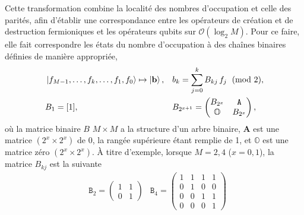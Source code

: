 \documentclass[12pt,a4paper,svgnames,x11names,rgb,table]{article} %
\numberwithin{equation}{section} %
\numberwithin{figure}{section} %
\numberwithin{table}{section} %
\begin{document}
Cette transformation combine la localité des nombres d'occupation et celle des parités, afin d'établir une correspondance entre les opérateurs de création et de destruction fermioniques et les opérateurs qubits sur $\mathcal{O}(\log_2M)$. Pour ce faire, elle fait correspondre les états du nombre d'occupation à des chaînes binaires définies de manière appropriée,
\begin{align}
    &\ket{f_{M-1},\dots,f_k,\dots, f_1,f_0}\mapsto \ket{\mathbf{b}} , &&b_k = \sum_{j=0}^k B_{kj} \, f_j \, \pmod 2,\\
    &B_1 = [1], &&B_{2^{x+1}}= \begin{pmatrix} B_{2^x} & \mathtt{A}\\ \mathbb{O} & B_{2^x}\end{pmatrix} ,
\end{align}
où la matrice binaire $B$ $M \times M$ a la structure d'un arbre binaire, $\mathbf{A}$ est une matrice $(2^x \times 2^x)$ de 0, la rangée supérieure étant remplie de 1, et $\mathbb{O}$ est une matrice zéro $(2^x \times 2^x)$. À titre d'exemple, lorsque $M = 2,4$ ($x=0,1$), la matrice $B_{kj}$ est la suivante
\begin{align}
    &\mathtt{B}_2 = \begin{pmatrix}1 & 1\\0 & 1 \end{pmatrix}
    &\mathtt{B}_4 = \left(\begin{array}{cc|cc}
    1 & 1 & 1 & 1 \\
    0 & 1 & 0 & 0 \\\hline
    0 & 0 & 1 & 1 \\
    0 & 0 & 0 & 1 
 \end{array}\right)
\end{align}
\end{document}

